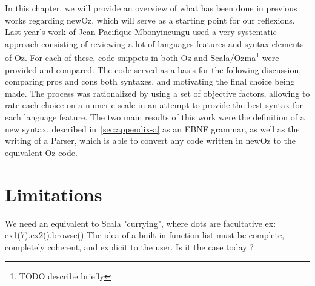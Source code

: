 
In this chapter, we will provide an overview of what has been done in previous works regarding newOz, which will serve as a starting point for our reflexions.\newline
Last year's work of Jean-Pacifique Mbonyincungu used a very systematic approach consisting of reviewing a lot of languages features and syntax elements of Oz.
For each of these, code snippets in both Oz and Scala/Ozma\footnote{TODO describe briefly} were provided and compared.
The code served as a basis for the following discussion, comparing pros and cons both syntaxes, and motivating the final choice being made.
The process was rationalized by using a set of objective factors, allowing to rate each choice on a numeric scale in an attempt to provide the best syntax for each language feature.
\newline
The two main results of this work were the definition of a new syntax, described in~\ref{sec:appendix-a} as an EBNF grammar, as well as the writing of a Parser, which is able to convert any code written in newOz to the equivalent Oz code.

\section{Limitations}\label{sec:limitations}
We need an equivalent to Scala "currying", where dots are facultative
ex: ex1(7).ex2().browse()
\newline
\newline
The idea of a built-in function list must be complete, completely coherent, and explicit to the user.
Is it the case today ?